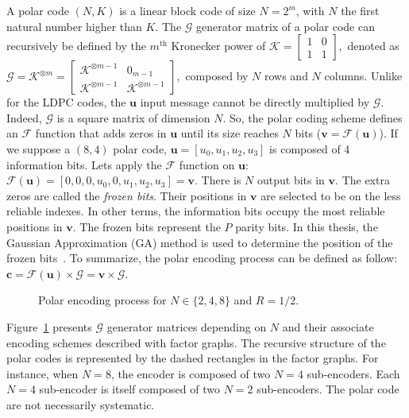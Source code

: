 A polar code $(N,K)$ is a linear block code of size $N = 2^m$, with $N$ the
first natural number higher than $K$. The $\bm{\mathcal{G}}$ generator matrix of
a polar code can recursively be defined by the $m^\text{th}$ Kronecker power of
$\bm{\mathcal{K}} =
\begin{bmatrix}
1 & 0 \\
1 & 1
\end{bmatrix},$
denoted as
$
\bm{\mathcal{G}} = \bm{\mathcal{K}}^{\otimes m} =
\begin{bmatrix}
\bm{\mathcal{K}}^{\otimes m-1} & 0_{m -1} \\
\bm{\mathcal{K}}^{\otimes m-1} & \bm{\mathcal{K}}^{\otimes m-1}
\end{bmatrix},
$
composed by $N$ rows and $N$ columns. Unlike for the LDPC codes, the $\bm{u}$
input message cannot be directly multiplied by $\bm{\mathcal{G}}$. Indeed,
$\bm{\mathcal{G}}$ is a square matrix of dimension $N$. So, the polar coding
scheme defines an $\mathcal{F}$ function that adds zeros in $\bm{u}$ until its
size reaches $N$ bits ($\bm{v} = \mathcal{F}(\bm{u})$). If we suppose a $(8,4)$
polar code, $\bm{u} = [u_0, u_1, u_2, u_3]$ is composed of 4 information bits.
Lets apply the $\mathcal{F}$ function on $\bm{u}$: $\mathcal{F}(\bm{u}) =
[0, 0, 0, u_0, 0, u_1, u_2, u_3] = \bm{v}$. There is $N$ output bits in
$\bm{v}$. The extra zeros are called the \emph{frozen bits}. Their positions in
$\bm{v}$ are selected to be on the less reliable indexes. In other terms, the
information bits occupy the most reliable positions in $\bm{v}$. The frozen bits
represent the $P$ parity bits. In this thesis, the Gaussian Approximation (GA)
method is used to determine the position of the frozen bits~\cite{Trifonov2012}.
To summarize, the polar encoding process can be defined as follow: $\bm{c} =
\mathcal{F}(\bm{u}) \times \bm{\mathcal{G}} = \bm{v} \times \bm{\mathcal{G}}$.

\begin{figure}[htp]
  \centering
  \caption{Polar encoding process for $N \in \{2, 4, 8\}$ and $R = 1/2$.}
  \label{fig:ctx_polar_encoder}
\end{figure}

\newpage
Figure~\ref{fig:ctx_polar_encoder} presents $\bm{\mathcal{G}}$ generator
matrices depending on $N$ and their associate encoding schemes described with
factor graphs. The recursive structure of the polar codes is represented by the
dashed rectangles in the factor graphs. For instance, when $N = 8$, the encoder
is composed of two $N = 4$ sub-encoders. Each $N = 4$ sub-encoder is itself
composed of two $N = 2$ sub-encoders. The polar code are not necessarily
systematic.

